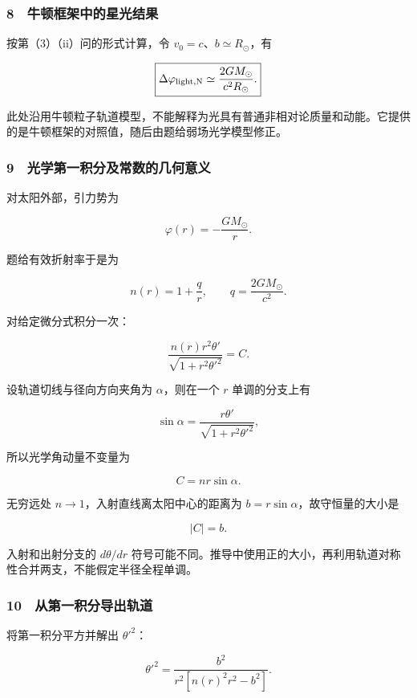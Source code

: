 \documentclass[12pt,a4paper,fontset=fandol]{ctexart}
\begin{document}
\subsubsection{8　牛顿框架中的星光结果}\label{ux725bux987fux6846ux67b6ux4e2dux7684ux661fux5149ux7ed3ux679c}

按第（3）（ii）问的形式计算，令 \(v_0=c\)、\(b\simeq R_\odot\)，有

\[\boxed{\Delta\varphi_{\rm light,N}
\simeq\frac{2GM_\odot}{c^2R_\odot}.}\]

此处沿用牛顿粒子轨道模型，不能解释为光具有普通非相对论质量和动能。它提供的是牛顿框架的对照值，随后由题给弱场光学模型修正。

\subsubsection{9　光学第一积分及常数的几何意义}\label{ux5149ux5b66ux7b2cux4e00ux79efux5206ux53caux5e38ux6570ux7684ux51e0ux4f55ux610fux4e49}

对太阳外部，引力势为

\[\varphi(r)=-\frac{GM_\odot}{r}.\]

题给有效折射率于是为

\[\boxed{n(r)=1+\frac qr,
\qquad q=\frac{2GM_\odot}{c^2}.}\]

对给定微分式积分一次：

\[\frac{n(r)r^2\theta'}{\sqrt{1+r^2\theta'^2}}=C.\]

设轨道切线与径向方向夹角为 \(\alpha\)，则在一个 \(r\) 单调的分支上有

\[\sin\alpha=\frac{r\theta'}{\sqrt{1+r^2\theta'^2}},\]

所以光学角动量不变量为

\[\boxed{C=nr\sin\alpha.}\]

无穷远处 \(n\to1\)，入射直线离太阳中心的距离为
\(b=r\sin\alpha\)，故守恒量的大小是

\[\boxed{|C|=b.}\]

入射和出射分支的 \(d\theta/dr\)
符号可能不同。推导中使用正的大小，再利用轨道对称性合并两支，不能假定半径全程单调。

\subsubsection{10　从第一积分导出轨道}\label{ux4eceux7b2cux4e00ux79efux5206ux5bfcux51faux8f68ux9053}

将第一积分平方并解出 \(\theta'^2\)：

\[\theta'^2=\frac{b^2}{r^2[n(r)^2r^2-b^2]}.\]
\end{document}
